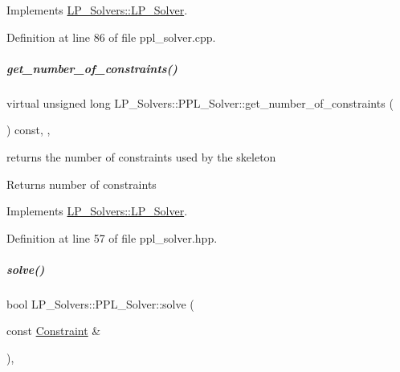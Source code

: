 Implements \hyperlink{group___c_l_s_solvers_a36c14a88e9d3ae9d9321acc7877236d0}{L\+P\+\_\+\+Solvers\+::\+L\+P\+\_\+\+Solver}.



Definition at line 86 of file ppl\+\_\+solver.\+cpp.

\mbox{\label{group___c_l_s_solvers_afb7f014f84eb37026fe26f8c3114c0f0}} 
\subparagraph{\texorpdfstring{get\+\_\+number\+\_\+of\+\_\+constraints()}{get\_number\_of\_constraints()}}
{\footnotesize\ttfamily virtual unsigned long L\+P\+\_\+\+Solvers\+::\+P\+P\+L\+\_\+\+Solver\+::get\+\_\+number\+\_\+of\+\_\+constraints (\begin{DoxyParamCaption}{ }\end{DoxyParamCaption}) const\hspace{0.3cm}{\ttfamily [inline]}, {\ttfamily [override]}, {\ttfamily [virtual]}}



returns the number of constraints used by the skeleton 

\begin{DoxyReturn}{Returns}
number of constraints 
\end{DoxyReturn}


Implements \hyperlink{group___c_l_s_solvers_a1a220bc10c6d8696dd5885d7f3678e5f}{L\+P\+\_\+\+Solvers\+::\+L\+P\+\_\+\+Solver}.



Definition at line 57 of file ppl\+\_\+solver.\+hpp.

\mbox{\label{group___c_l_s_solvers_a9a4a7563d62e4394162aaa4bd08aae29}} 
\subparagraph{\texorpdfstring{solve()}{solve()}\hspace{0.1cm}{\footnotesize\ttfamily [1/2]}}
{\footnotesize\ttfamily bool L\+P\+\_\+\+Solvers\+::\+P\+P\+L\+\_\+\+Solver\+::solve (\begin{DoxyParamCaption}\item[{const \hyperlink{group___c_l_s_solvers_class_l_p___solvers_1_1_constraint}{Constraint} \&}]{ }\end{DoxyParamCaption})\hspace{0.3cm}{\ttfamily [override]}, {\ttfamily [virtual]}}



